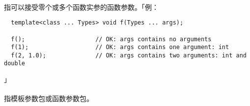 \paragraph{}
指可以接受零个或多个函数实参的函数参数。「例：
\begin{lstlisting}
  template<class ... Types> void f(Types ... args);

  f();                    // OK: args contains no arguments
  f(1);                   // OK: args contains one argument: int
  f(2, 1.0);              // OK: args contains two arguments: int and double
\end{lstlisting}」

\paragraph{}
指模板参数包或函数参数包。

